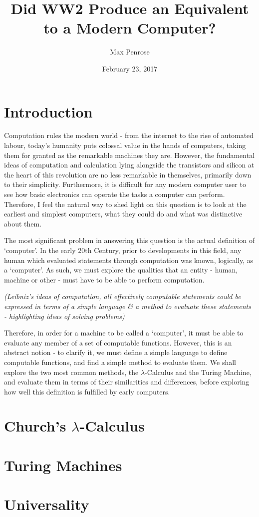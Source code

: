 \documentclass {article}
\title{Did WW2 Produce an Equivalent to a Modern Computer?}
\date{February 23, 2017}
\author{Max Penrose}
\begin{document}
\maketitle
\tableofcontents
\clearpage

\section*{Introduction}
Computation rules the modern world - from the internet to the rise of automated labour, today's humanity puts colossal value in the hands of computers, taking them for granted as the remarkable machines they are. However, the fundamental ideas of computation and calculation lying alongside the transistors and silicon at the heart of this revolution are no less remarkable in themselves, primarily down to their simplicity. Furthermore, it is difficult for any modern computer user to see how basic electronics can operate the tasks a computer can perform. Therefore, I feel the natural way to shed light on this question is to look at the earliest and simplest computers, what they could do and what was distinctive about them.

The most significant problem in answering this question is the actual definition of `computer'. In the early 20th Century, prior to developments in this field, any human which evaluated statements through computation was known, logically, as a `computer'. As such, we must explore the qualities that an entity - human, machine or other - must have to be able to perform computation.

\textit{(Leibniz's ideas of computation, all effectively computable statements could be expressed in terms of a simple language \& a method to evaluate these statements - highlighting ideas of solving problems)}

Therefore, in order for a machine to be called a `computer', it must be able to evaluate any member of a set of computable functions. However, this is an abstract notion - to clarify it, we must define a simple language to define computable functions, and find a simple method to evaluate them. We shall explore the two most common methods, the $\lambda$-Calculus and the Turing Machine, and evaluate them in terms of their similarities and differences, before exploring how well this definition is fulfilled by early computers.



\section{Church's $\lambda$-Calculus}



\section{Turing Machines}



\section{Universality}




\end{document}
